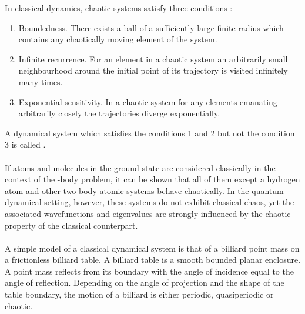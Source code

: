 In classical dynamics, chaotic systems satisfy three conditions \cite{port}:
\begin{enumerate}
	\item Boundedness. There exists a ball of a sufficiently large finite radius which contains any chaotically moving element of the system.
	\item Infinite recurrence. For an element in a chaotic system an arbitrarily small neighbourhood around the initial point of its trajectory is visited infinitely many times.
	\item Exponential sensitivity. In a chaotic system for any elements emanating arbitrarily closely the trajectories diverge exponentially.  
\end{enumerate}
A dynamical system which satisfies the conditions 1 and 2 but not the condition 3 is called .\\\\
If atoms and molecules in the ground state are considered classically in the context of the -body problem, it can be shown that all of them except a hydrogen atom and other two-body atomic systems behave chaotically. \cite{atph} In the quantum dynamical setting, however, these systems do not exhibit classical chaos, yet the associated wavefunctions and eigenvalues are strongly influenced by the chaotic property of the classical counterpart.\\\\
A simple model of a classical dynamical system is that of a billiard point mass on a frictionless billiard table. \cite{zeev,sinai} A billiard table is a smooth bounded planar enclosure. A point mass reflects from its boundary with the angle of incidence equal to the angle of reflection. Depending on the angle of projection and the shape of the table boundary, the motion of a billiard is either periodic, quasiperiodic or chaotic.
